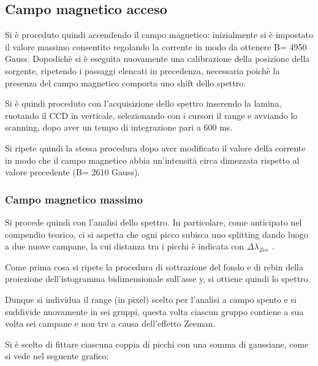 \documentclass{article}
\begin{document}
	\subsection*{Campo magnetico acceso}
	
	Si è proceduto quindi accendendo il campo magnetico: inizialmente si è impostato il valore massimo 
	consentito regolando la corrente in modo da ottenere B= 4950 Gauss. 
	Dopodichè si è eseguita nuovamente una calibrazione della posizione della sorgente, ripetendo i 
	passaggi elencati in precedenza, necessaria poichè la presenza del campo magnetico 
	comporta uno shift dello spettro.

	Si è quindi proceduto con l'acquisizione dello spettro inserendo la lamina, ruotando il CCD 
	in verticale, selezionando con i cursori il range e avviando lo scanning, dopo aver un tempo 
	di integrazione pari a 600 ms.
	
	Si ripete quindi  la stessa procedura dopo aver modificato il valore della corrente in modo 
	che il campo magnetico abbia un'intensità circa dimezzata rispetto al valore precedente 
	(B= 2610 Gauss).
	
	\subsubsection*{Campo magnetico massimo}

	Si procede quindi con l'analisi dello spettro.
	In particolare, come anticipato nel compendio teorico, ci si aspetta che ogni picco subisca uno 
	splitting dando luogo a due nuove campane, la cui distanza tra i picchi è indicata con 
	$\Delta \lambda_{Zee} $ .
	 
	Come prima cosa si ripete la procedura di sottrazione del fondo e di rebin della proiezione 
	dell'istogramma bidimensionale sull'asse y, si ottiene quindi lo spettro.
	 
	Dunque si individua il range (in pixel) scelto per l'analisi a campo spento e si suddivide 
	nuovamente in sei gruppi, questa volta ciascun gruppo contiene a sua volta sei campane e 
	non tre a causa dell'effetto Zeeman.
	
	Si è scelto di fittare ciascuna coppia di picchi con una somma di gaussiane, come 
	si vede nel seguente grafico:
	
\end{document}
